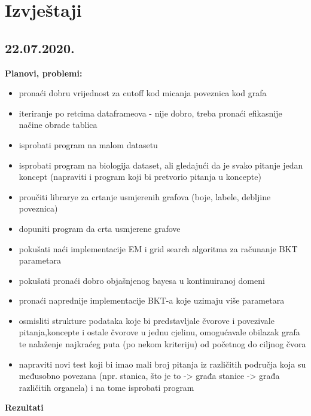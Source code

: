 \documentclass[times, utf8,projekt]{fer}
\begin{document}
		
		
		
	
		 
		

		
	\section{Izvještaji}
		\subsection{22.07.2020.}
		\textbf{Planovi, problemi:}
		\begin{itemize}
			\item pronaći dobru vrijednost za cutoff kod micanja poveznica kod grafa
			\item iteriranje po retcima dataframeova - nije dobro, treba pronaći efikasnije načine obrade tablica
			\item isprobati program na malom datasetu
			\item isprobati program na biologija dataset, ali gledajući da je svako pitanje jedan koncept (napraviti i program koji bi pretvorio pitanja u koncepte)
			\item proučiti librarye za crtanje usmjerenih grafova (boje, labele, debljine poveznica)
			\item dopuniti program da crta usmjerene grafove
			\item pokušati naći implementacije EM i grid search algoritma za računanje BKT parametara
			\item pokušati pronaći dobro objašnjenog bayesa u kontinuiranoj domeni
			\item pronaći naprednije implementacije BKT-a koje uzimaju više parametara
			\item osmisliti strukture podataka koje bi predstavljale čvorove i povezivale pitanja,koncepte i ostale čvorove u jednu cjelinu, omogućavale obilazak grafa te nalaženje najkraćeg puta (po nekom kriteriju) od početnog do ciljnog čvora
			\item napraviti novi test koji bi imao mali broj pitanja iz različitih područja koja su međusobno povezana (npr. stanica, što je to -> građa stanice -> građa različitih organela) i na tome isprobati program\newline
		\end{itemize}
		\textbf{Rezultati}
\end{document}
